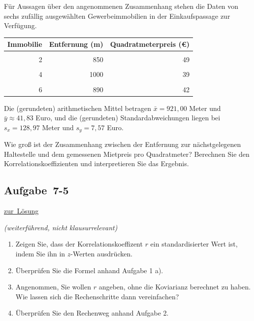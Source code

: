 \documentclass[
  11pt,
  ngerman,
  a4paper,
]{report}
\providecommand{\tightlist}{%
  \setlength{\itemsep}{0pt}\setlength{\parskip}{0pt}}
\begin{document}
Für Aussagen über den angenommenen Zusammenhang stehen die Daten von sechs zufällig ausgewählten Gewerbeimmobilien in der Einkaufspassage zur Verfügung.

\begin{table}
\centering
\begin{tabular}{rrr}
\toprule
\textbf{Immobilie} & \textbf{Entfernung (m)} & \textbf{Quadratmeterpreis (€)}\\
\midrule
\cellcolor{gray!6}{1} & \cellcolor{gray!6}{1141} & \cellcolor{gray!6}{30}\\
2 & 850 & 49\\
\cellcolor{gray!6}{3} & \cellcolor{gray!6}{862} & \cellcolor{gray!6}{40}\\
4 & 1000 & 39\\
\cellcolor{gray!6}{5} & \cellcolor{gray!6}{783} & \cellcolor{gray!6}{51}\\
6 & 890 & 42\\
\bottomrule
\end{tabular}
\end{table}

Die (gerundeten) arithmetischen Mittel betragen \(\bar{x} = 921{,}00\) Meter und \(\bar{y} \approx 41{,}83\) Euro, und die (gerundeten) Standardabweichungen liegen bei \(s_x = 128{,}97\) Meter und \(s_y = 7{,}57\) Euro.

Wie groß ist der Zusammenhang zwischen der Entfernung zur nächstgelegenen Haltestelle und dem gemessenen Mietpreis pro Quadratmeter? Berechnen Sie den Korrelationskoeffizienten und interpretieren Sie das Ergebnis.

\hypertarget{aufgabe-7-5}{%
\subsection{Aufgabe~7-5}\label{aufgabe-7-5}}

\protect\hyperlink{loesung-7-5}{zur~Lösung}

\emph{(weiterführend, nicht klausurrelevant)}

\begin{enumerate}
\def\labelenumi{\alph{enumi})}
\tightlist
\item
  Zeigen Sie, dass der Korrelationskoeffizent \(r\) ein standardisierter Wert ist, indem Sie ihn in \(z\)-Werten ausdrücken.
\item
  Überprüfen Sie die Formel anhand Aufgabe 1 a).
\item
  Angenommen, Sie wollen \(r\) angeben, ohne die Koviarianz berechnet zu haben. Wie lassen sich die Rechenschritte dann vereinfachen?
\item
  Überprüfen Sie den Rechenweg anhand Aufgabe 2.
\end{enumerate}
\end{document}
